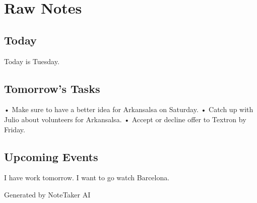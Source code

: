 \documentclass[11pt,a4paper]{article}
\begin{document}
\section*{Raw Notes}
\subsection*{Today}
Today is Tuesday.

\subsection*{Tomorrow's Tasks}
• Make sure to have a better idea for Arkansalsa on Saturday.
• Catch up with Julio about volunteers for Arkansalsa.
• Accept or decline offer to Textron by Friday.

\subsection*{Upcoming Events}
I have work tomorrow.
I want to go watch Barcelona.

\vspace{1cm}

\begin{center}
\textcolor{secondarycolor}{\small Generated by NoteTaker AI}
\end{center}
\end{document}
